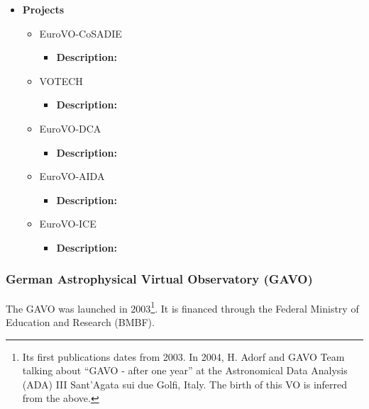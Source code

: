 \begin{itemize}
    \item \textbf{Projects}
    \begin{itemize}
        \item EuroVO-CoSADIE
            \begin{itemize}
                \item \textbf{Description:}
            \end{itemize}
        \item VOTECH
             \begin{itemize}
                \item \textbf{Description:}
             \end{itemize}
        \item EuroVO-DCA
             \begin{itemize}
                \item \textbf{Description:}
             \end{itemize}
        \item EuroVO-AIDA
             \begin{itemize}
                \item \textbf{Description:}
             \end{itemize}
         \item EuroVO-ICE
             \begin{itemize}
                \item \textbf{Description:}
             \end{itemize}
    \end{itemize}
\end{itemize}

\subsubsection{German Astrophysical Virtual Observatory (GAVO)}
The GAVO was launched in 2003\footnote{Its first publications dates from 2003.
In 2004, H. Adorf and GAVO Team talking about ``GAVO - after one year'' at the
Astronomical Data Analysis (ADA) III Sant'Agata sui due Golfi, Italy. The birth
of this VO is inferred from the above.}. It is financed through the Federal
Ministry of Education and Research (BMBF).

